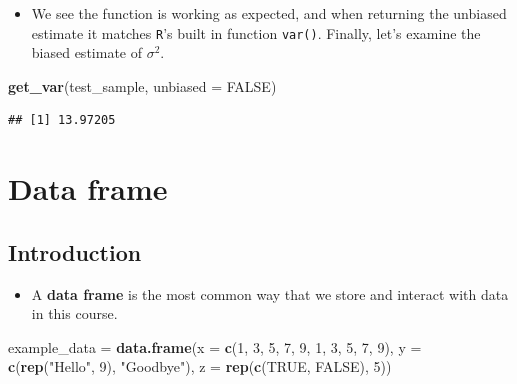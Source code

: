 \documentclass[]{book}
\newenvironment{Shaded}{\begin{snugshade}}{\end{snugshade}}
\newcommand{\KeywordTok}[1]{\textcolor[rgb]{0.13,0.29,0.53}{\textbf{#1}}}
\newcommand{\DataTypeTok}[1]{\textcolor[rgb]{0.13,0.29,0.53}{#1}}
\newcommand{\DecValTok}[1]{\textcolor[rgb]{0.00,0.00,0.81}{#1}}
\newcommand{\StringTok}[1]{\textcolor[rgb]{0.31,0.60,0.02}{#1}}
\newcommand{\OtherTok}[1]{\textcolor[rgb]{0.56,0.35,0.01}{#1}}
\newcommand{\NormalTok}[1]{#1}
\providecommand{\tightlist}{%
  \setlength{\itemsep}{0pt}\setlength{\parskip}{0pt}}
\begin{document}
\begin{itemize}
\tightlist
\item
  We see the function is working as expected, and when returning the
  unbiased estimate it matches \texttt{R}'s built in function
  \texttt{var()}. Finally, let's examine the biased estimate of
  \(\sigma^2\).
\end{itemize}

\begin{Shaded}
\begin{Highlighting}[]
\KeywordTok{get_var}\NormalTok{(test_sample, }\DataTypeTok{unbiased =} \OtherTok{FALSE}\NormalTok{)}
\end{Highlighting}
\end{Shaded}

\begin{verbatim}
## [1] 13.97205
\end{verbatim}

\chapter{Data frame}\label{data-frame}

\section{Introduction}\label{introduction}

\begin{itemize}
\tightlist
\item
  A \textbf{data frame} is the most common way that we store and
  interact with data in this course.
\end{itemize}

\begin{Shaded}
\begin{Highlighting}[]
\NormalTok{example_data =}\StringTok{ }\KeywordTok{data.frame}\NormalTok{(}\DataTypeTok{x =} \KeywordTok{c}\NormalTok{(}\DecValTok{1}\NormalTok{, }\DecValTok{3}\NormalTok{, }\DecValTok{5}\NormalTok{, }\DecValTok{7}\NormalTok{, }\DecValTok{9}\NormalTok{, }\DecValTok{1}\NormalTok{, }\DecValTok{3}\NormalTok{, }\DecValTok{5}\NormalTok{, }\DecValTok{7}\NormalTok{, }\DecValTok{9}\NormalTok{),}
                          \DataTypeTok{y =} \KeywordTok{c}\NormalTok{(}\KeywordTok{rep}\NormalTok{(}\StringTok{"Hello"}\NormalTok{, }\DecValTok{9}\NormalTok{), }\StringTok{"Goodbye"}\NormalTok{),}
                          \DataTypeTok{z =} \KeywordTok{rep}\NormalTok{(}\KeywordTok{c}\NormalTok{(}\OtherTok{TRUE}\NormalTok{, }\OtherTok{FALSE}\NormalTok{), }\DecValTok{5}\NormalTok{))}
\end{Highlighting}
\end{Shaded}
\end{document}
